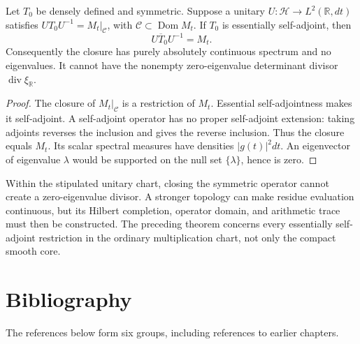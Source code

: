 \begin{theorem}
\label{v4-arith:w9-r4:thm:execution-result}
Let \(T_0\) be densely defined and symmetric. Suppose a unitary
\(U:\mathcal H\to L^2(\mathbb R,dt)\) satisfies
\(UT_0U^{-1}=M_t|_{\mathcal C}\), with
\(\mathcal C\subset\operatorname{Dom}M_t\).
If \(T_0\) is essentially self-adjoint, then
\[
 U\overline T_0U^{-1}=M_t.
\]
Consequently the closure has purely absolutely continuous
spectrum and no eigenvalues. It cannot have the nonempty
zero-eigenvalue determinant divisor \(\operatorname{div}\xi_{\mathbb R}\).
\end{theorem}
\begin{proof}
The closure of \(M_t|_{\mathcal C}\) is a restriction of \(M_t\).
Essential self-adjointness makes it self-adjoint. A self-adjoint
operator has no proper self-adjoint extension: taking adjoints
reverses the inclusion and gives the reverse inclusion. Thus the
closure equals \(M_t\). Its scalar spectral measures have densities
\(|g(t)|^2dt\). An eigenvector of eigenvalue \(\lambda\) would
be supported on the null set \(\{\lambda\}\), hence is zero.
\end{proof}

\begin{remark}
\label{v4-arith:w9-r4:rem:failed-execution-record}
Within the stipulated unitary chart, closing the symmetric
operator cannot create a zero-eigenvalue divisor.
A stronger topology can make residue evaluation continuous,
but its Hilbert completion, operator domain, and arithmetic trace
must then be constructed. The preceding theorem concerns every
essentially self-adjoint restriction in the ordinary multiplication
chart, not only the compact smooth core.
\end{remark}

\section{Bibliography}
\label{v4-arith:w9-r4:biblio}

The references below form six groups, including references to
earlier chapters.

